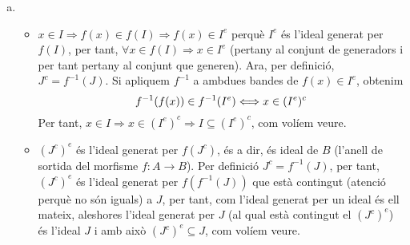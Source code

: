 \documentclass[../main.tex]{subfiles}
\begin{document}
\begin{sol}
\begin{enumerate}[(a)]
    
    \item \begin{itemize}
        \item {} $x\in I\Rightarrow f(x)\in f(I)\Rightarrow f(x)\in I^{e}$ perquè $I^{e}$ és l'ideal generat per $f(I)$, per tant, $\forall x\in f(I)\Rightarrow x\in I^{e}$ (pertany al conjunt de generadors i per tant pertany al conjunt que generen). Ara, per definició, $J^c=f^{-1}(J)$. Si apliquem $f^{-1}$ a ambdues bandes de $f(x)\in I^{e}$, obtenim
        \begin{equation}
            \notag
            f^{-1}(f(x))\in f^{-1}(I^{e})\Longleftrightarrow x\in (I^{e})^c
        \end{equation}
        Per tant, $x\in I\Rightarrow x\in (I^{e})^c\Rightarrow I\subseteq (I^{e})^c$, com volíem veure.
        
        \item {} $(J^c)^{e}$ és l'ideal generat per $f(J^c)$, és a dir, és ideal de $B$ (l'anell de sortida del morfisme $f:A\rightarrow B$). Per definició $J^c = f^{-1}(J)$, per tant, $(J^c)^{e}$ és l'ideal generat per $f(f^{-1}(J))$ que està contingut (atenció perquè no són iguals) a $J$, per tant, com l'ideal generat per un ideal és ell mateix, aleshores l'ideal generat per $J$ (al qual està contingut el $(J^c)^{e}$) és l'ideal $J$ i amb això $(J^c)^{e}\subseteq J$, com volíem veure. 
    \end{itemize}
    

\end{enumerate}
\end{sol}
\end{document}
